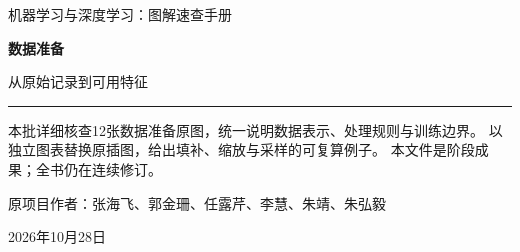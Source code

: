 \documentclass[a4paper,11pt,oneside,openany]{book}
\begin{document}
\frontmatter
\hypersetup{pageanchor=false}
\begin{titlepage}
\vspace*{16mm}
{\sffamily\color{Teal}\large 机器学习与深度学习：图解速查手册\par}
\vspace{15mm}
{\sffamily\bfseries\color{Ink}\Huge 数据准备\par}
\vspace{6mm}
{\sffamily\color{Ink}\LARGE 从原始记录到可用特征\par}
\vspace{12mm}
\noindent\textcolor{Teal}{\rule{\textwidth}{1.2pt}}
\vspace{7mm}
\begin{keyidea}[第四批阶段样章]
本批详细核查12张数据准备原图，统一说明数据表示、处理规则与训练边界。
以独立图表替换原插图，给出填补、缩放与采样的可复算例子。
本文件是阶段成果；全书仍在连续修订。
\end{keyidea}
\vfill
原项目作者：张海飞、郭金珊、任露芹、李慧、朱靖、朱弘毅\par
\vspace{4mm}
2026年10月28日\par
\end{titlepage}
\hypersetup{pageanchor=true}
\tableofcontents
\mainmatter
\setcounter{chapter}{3}

\end{document}
